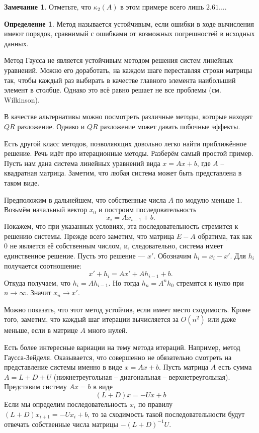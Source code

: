 \documentclass[10pt,a4paper,oneside]{book}
\theoremstyle{definition}
\newtheorem*{rem}{\color{green!50!blue}Замечание}
\newtheorem*{defn}{\color{yellow!30!red} Определение}
\def\dfn{\begin{defn}}
\def\edfn{\end{defn}}
\def\rm{\begin{rem}}
\def\erm{\end{rem}}
\begin{document}
\rm Отметьте, что $\kappa_2(A)$ в этом примере всего лишь $2.61...$.
\erm

\dfn Метод называется устойчивым, если ошибки в ходе вычисления имеют порядок, сравнимый с ошибками от возможных погрешностей в исходных данных.
\edfn

Метод Гаусса не является устойчивым методом решения систем линейных уравнений. Можно его доработать, на каждом шаге переставляя строки матрицы так, чтобы каждый раз выбирать в качестве главного элемента  наибольший элемент в столбце. Однако это всё равно решает не все проблемы (см. Wilkinson).

В качестве альтернативы можно посмотреть различные методы, которые находят $QR$ разложение. Однако и $QR$ разложение может давать побочные эффекты.





Есть другой класс методов, позволяющих довольно легко найти приближённое решение. Речь идёт про  итерационные методы. Разберём самый простой пример. Пусть нам дана система линейных уравнений вида $x=Ax+b$, где $A$ -- квадратная матрица. Заметим, что любая система может быть представлена в таком виде. 

Предположим в дальнейшем, что собственные числа $A$ по модулю меньше $1$. Возьмём начальный вектор $x_0$ и построим последовательность
$$x_i=Ax_{i-1}+b.$$
Покажем, что при указанных условиях, эта последовательность стремится к решению системы. Прежде всего заметим, что матрица $E-A$ обратима, так как $0$ не является её собственным числом, и, следовательно, система имеет единственное решение. Пусть это решение --- $x'$. Обозначим $h_i=x_i-x'$. Для $h_i$ получается соотношение:
$$x'+h_i=Ax'+Ah_{i-1}+b.$$
Откуда получаем, что $h_i=Ah_{i-1}$. Но тогда $h_n=A^n h_0$ стремятся к нулю при $n\to \infty$. Значит $x_n\to x'$.


Можно показать, что этот метод устойчив, если имеет место сходимость. Кроме того, заметим, что каждый шаг итерации вычисляется за $O(n^2)$ или даже меньше, если в матрице $A$ много нулей.

Есть более интересные вариации на тему метода итераций. Например, метод Гаусса-Зейделя. Оказывается, что совершенно не обязательно смотреть на представление системы именно в виде $x=Ax+b$. Пусть матрица $A$ есть сумма $A=L+D+U$ (нижнетреугольная -- диагональная -- верхнетреугольная). Представим систему $Ax=b$ в виде 
$$(L+D)x=-Ux+b$$
Если мы определим последовательность $x_i$ по правилу $(L+D)x_{i+1}=-Ux_i+b$, то за сходимость такой последовательности будут отвечать собственные числа матрицы $-(L+D)^{-1}U$. 
\end{document}
